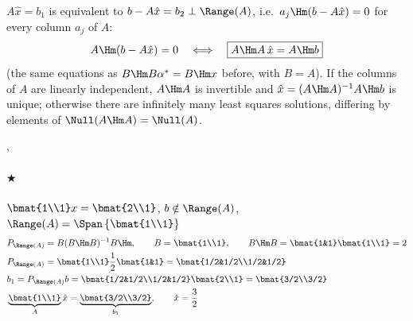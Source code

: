 \begin{insight}
$A\hat x = b_1$ is equivalent to $b - A\hat x = b_2 \perp \Range(A)$, i.e.\ $a_j\Hm(b-A\hat x) = 0$ for every
column $a_j$ of $A$:
\[
A\Hm(b-A\hat x) = 0 \quad\Longleftrightarrow\quad \boxed{A\Hm A\,\hat x = A\Hm b}
\]
(the same equations as $B\Hm B\alpha^* = B\Hm x$ before, with $B=A$).  If the columns of $A$ are linearly independent, $A\Hm A$ is invertible and
$\hat x = (A\Hm A)^{-1}A\Hm b$ is unique; otherwise there are infinitely many least squares solutions,
differing by elements of $\Null(A\Hm A)=\Null(A)$.
\end{insight}

\sep
\paragraph{$\bigstar$} $\displaystyle \bmat{1\\1}x = \bmat{2\\1}$, \qquad $b\notin\Range(A)$, \qquad
$\Range(A) = \Span\left\{\bmat{1\\1}\right\}$
\begin{align*}
&P_{\Range(A)} = B(B\Hm B)^{-1}B\Hm, \qquad B = \bmat{1\\1}, \qquad B\Hm B = \bmat{1&1}\bmat{1\\1} = 2\\
&P_{\Range(A)} = \bmat{1\\1}\frac12\bmat{1&1} = \bmat{1/2&1/2\\1/2&1/2}\\
&b_1 = P_{\Range(A)}b = \bmat{1/2&1/2\\1/2&1/2}\bmat{2\\1} = \bmat{3/2\\3/2}\\
&\underbrace{\bmat{1\\1}}_{A}\hat x = \underbrace{\bmat{3/2\\3/2}}_{b_1},
\qquad \hat x = \frac32
\end{align*}

